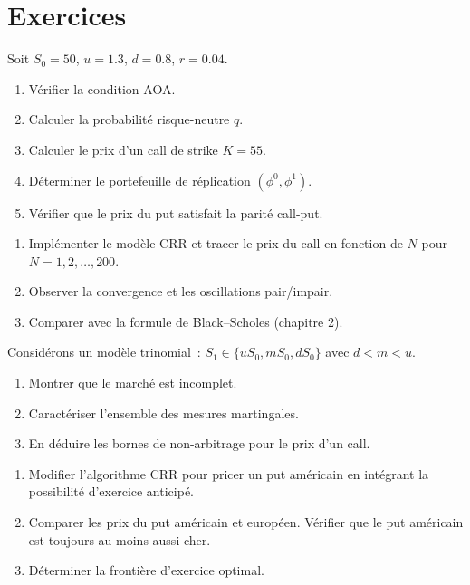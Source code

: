 \section{Exercices}

\begin{exercice}
Soit $S_0 = 50$, $u = 1.3$, $d = 0.8$, $r = 0.04$.
\begin{enumerate}
    \item V\'erifier la condition AOA.
    \item Calculer la probabilit\'e risque-neutre $q$.
    \item Calculer le prix d'un call de strike $K = 55$.
    \item D\'eterminer le portefeuille de r\'eplication $(\phi^0, \phi^1)$.
    \item V\'erifier que le prix du put satisfait la parit\'e call-put.
\end{enumerate}
\end{exercice}

\begin{exercice}
\begin{enumerate}
    \item Impl\'ementer le mod\`ele CRR et tracer le prix du call en
          fonction de $N$ pour $N = 1, 2, \ldots, 200$.
    \item Observer la convergence et les oscillations pair/impair.
    \item Comparer avec la formule de Black--Scholes (chapitre 2).
\end{enumerate}
\end{exercice}

\begin{exercice}
Consid\'erons un mod\`ele trinomial~: $S_1 \in \{uS_0, mS_0, dS_0\}$
avec $d < m < u$.
\begin{enumerate}
    \item Montrer que le march\'e est incomplet.
    \item Caract\'eriser l'ensemble des mesures martingales.
    \item En d\'eduire les bornes de non-arbitrage pour le prix d'un call.
\end{enumerate}
\end{exercice}

\begin{exercice}
\begin{enumerate}
    \item Modifier l'algorithme CRR pour pricer un put am\'ericain en
          int\'egrant la possibilit\'e d'exercice anticip\'e.
    \item Comparer les prix du put am\'ericain et europ\'een. V\'erifier
          que le put am\'ericain est toujours au moins aussi cher.
    \item D\'eterminer la fronti\`ere d'exercice optimal.
\end{enumerate}
\end{exercice}
